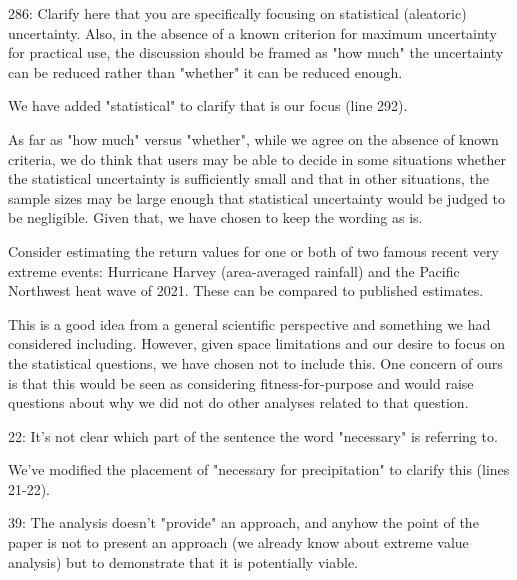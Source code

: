 \documentclass[12pt,english]{reviewresponse}
\begin{document}
\begin{revcomment}
 286: Clarify here that you are specifically focusing on statistical (aleatoric) uncertainty.  Also, in the absence of a known criterion for maximum uncertainty for practical use, the discussion should be framed as "how much" the uncertainty can be reduced rather than "whether" it can be reduced enough.
\end{revcomment}

\begin{revresponse}
We have added "statistical" to clarify that is our focus (line 292). 

As far as "how much" versus "whether", while we agree on the absence of known criteria, we do think that users may be able to decide in some situations whether the statistical uncertainty is sufficiently small and that in other situations, the sample sizes may be large enough that statistical uncertainty would be judged to be negligible. Given that, we have chosen to keep the wording as is.
\end{revresponse}

\begin{revcomment}
   Consider estimating the return values for one or both of two famous recent very extreme events: Hurricane Harvey (area-averaged rainfall) and the Pacific Northwest heat wave of 2021.  These can be compared to published estimates.
 
\end{revcomment}
\begin{revresponse}
    This is a good idea from a general scientific perspective and something we had considered including. However, given space limitations and our desire to focus on the statistical questions, we have chosen not to include this. One concern of ours is that this would be seen as considering fitness-for-purpose and would raise questions about why we did not do other analyses related to that question.
\end{revresponse}


\begin{revcomment}
 22: It's not clear which part of the sentence the word "necessary" is referring to.
   
\end{revcomment}
\begin{revresponse}
We've modified the placement of "necessary for precipitation" to clarify this (lines 21-22).
   \end{revresponse} 
\begin{revcomment}
    39: The analysis doesn't "provide" an approach, and anyhow the point of the paper is not to present an approach (we already know about extreme value analysis) but to demonstrate that it is potentially viable.
\end{revcomment}
\end{document}
